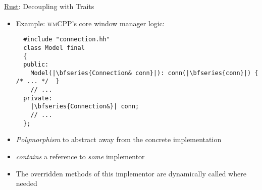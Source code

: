 \begin{frame}[c,fragile]{\underline{Rust}: Decoupling with Traits \hfill {\footnotesize \currentname}}


    \begin{itemize}

        \item Example: \textsc{wmCPP}'s core window manager logic:\\
\begin{verbatim}
  #include "connection.hh"
  class Model final
  {
  public:
    Model(|\bfseries{Connection& conn}|): conn(|\bfseries{conn}|) { /* ... */  }
    // ...
  private:
    |\bfseries{Connection&}| conn;
    // ...
  };
\end{verbatim}

        \item \textit{Polymorphism} to abstract away from the concrete implementation\\

        \item {} \textit{contains} a reference to \textit{some}  implementor\\

        \item The overridden methods of this implementor are dynamically called where needed\\

    \end{itemize}

    \vfill

\end{frame}
